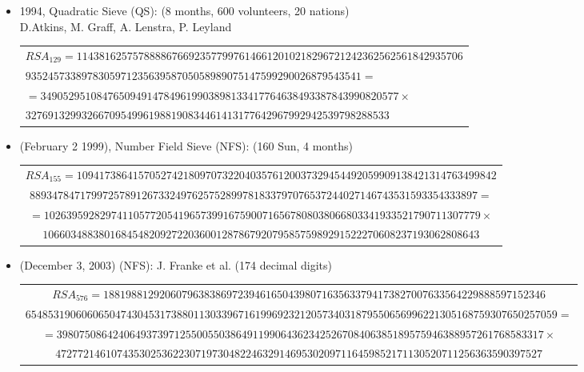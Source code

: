 \documentclass[landscape,display]{powersem} %
\newcommand{\heading}[1]{%
 \begin{center}
  \large\bf
  \shadowbox{{\textcolor{conceptcolor}{#1}}}%
 \end{center}
 \vspace{1ex minus 1ex}}
\begin{document}
\begin{slide}
\heading{Contemporary Factoring}\vspace{-3mm}\pause

\begin{itemize}
  \item[\textcolor{blue}{\ding{182}}] 1994, Quadratic Sieve (QS): (8 months, 600 volunteers, 20 nations)\\
  D.Atkins, M. Graff, A. Lenstra, P. Leyland
\begin{tiny}\begin{tabular}{l}
$  RSA_{129} = 114381625757888867669235779976146612010218296721242362562561842935706$\\
\hspace*{5mm}$935245733897830597123563958705058989075147599290026879543541=$\\
$        = 3490529510847650949147849619903898133417764638493387843990820577 \times$\\
$
32769132993266709549961988190834461413177642967992942539798288533
$\end{tabular}\end{tiny}\pause

  \item[\textcolor{blue}{\ding{183}}] (February 2 1999), Number Field Sieve (NFS): (160 Sun, 4 months)
 \begin{tiny}\begin{tabular}{c}
\hspace*{-1cm}$ RSA_{155} = 109417386415705274218097073220403576120037329454492059909138421314763499842$\\
$88934784717997257891267332497625752899781833797076537244027146743531593354333897=$\\
$=102639592829741105772054196573991675900716567808038066803341933521790711307779
\times$\\
$106603488380168454820927220360012878679207958575989291522270608237193062808643
$\end{tabular}\end{tiny}\pause

  \item[\textcolor{blue}{\ding{184}}] (December 3, 2003) (NFS): J. Franke et al. (174 decimal digits)
 \begin{tiny}\begin{tabular}{c}
\hspace*{-1cm}$ RSA_{576} = 1881988129206079638386972394616504398071635633794173827007633564229888597152346$\\
$65485319060606504743045317388011303396716199692321205734031879550656996221305168759307650257059=$\\
$=398075086424064937397125500550386491199064362342526708406385189575946388957261768583317\times$\\
$472772146107435302536223071973048224632914695302097116459852171130520711256363590397527
$\end{tabular}\end{tiny}\pause


\end{itemize}
\end{slide}
\end{document}

